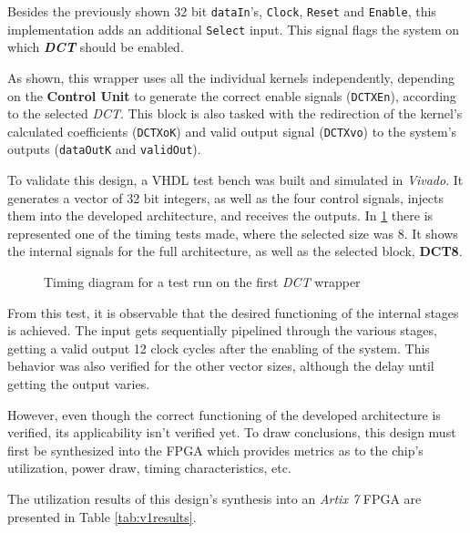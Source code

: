 Besides the previously shown 32 bit \texttt{dataIn}'s, \texttt{Clock}, \texttt{Reset} and \texttt{Enable}, this implementation adds an additional \texttt{Select} input. This signal flags the system on which \emph{\textbf{DCT}} should be enabled.

As shown, this wrapper uses all the individual kernels independently, depending on the \textbf{Control Unit} to generate the correct enable signals (\texttt{DCTXEn}), according to the selected \emph{DCT}. This block is also tasked with the redirection of the kernel's calculated coefficients (\texttt{DCTXoK}) and valid output signal (\texttt{DCTXvo}) to the system's outputs (\texttt{dataOutK} and \texttt{validOut}).

To validate this design, a VHDL test bench was built and simulated in \emph{Vivado}. It generates a vector of 32 bit integers, as well as the four control signals, injects them into the developed architecture, and receives the outputs. In \ref{fig:v1timing} there is represented one of the timing tests made, where the selected size was 8. It shows the internal signals for the full architecture, as well as the selected block, \textbf{DCT8}.

\begin{figure}[!htbp]
    \centering
    
    \caption{Timing diagram for a test run on the first \emph{DCT} wrapper}
    \label{fig:v1timing}
\end{figure}

From this test, it is observable that the desired functioning of the internal stages is achieved. The input gets sequentially pipelined through the various stages, getting a valid output 12 clock cycles after the enabling of the system. This behavior was also verified for the other vector sizes, although the delay until getting the output varies.

However, even though the correct functioning of the developed architecture is verified, its applicability isn't verified yet. To draw conclusions, this design must first be synthesized into the FPGA which provides metrics as to the chip's utilization, power draw, timing characteristics, etc.

The utilization results of this design's synthesis into an \emph{Artix 7} FPGA are presented in Table \ref{tab:v1results}. 

